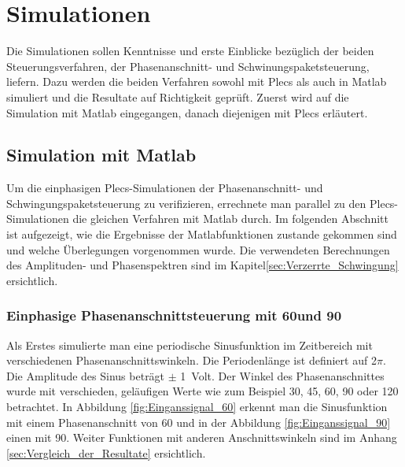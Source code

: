 \section{Simulationen}

Die Simulationen sollen Kenntnisse und erste Einblicke bezüglich der beiden Steuerungsverfahren, der Phasenanschnitt- und Schwinungspaketsteuerung, liefern. Dazu werden die beiden Verfahren sowohl mit Plecs als auch in Matlab simuliert und die Resultate auf Richtigkeit geprüft. Zuerst wird auf die Simulation mit Matlab eingegangen, danach diejenigen mit Plecs erläutert.

\subsection{Simulation mit Matlab}\label{sec:Simulation_mit_Matlab}
Um die einphasigen Plecs-Simulationen der Phasenanschnitt- und Schwingungspaketsteuerung zu verifizieren, errechnete man parallel zu den Plecs-Simulationen die gleichen Verfahren mit Matlab durch. Im folgenden Abschnitt ist aufgezeigt, wie die Ergebnisse der Matlabfunktionen zustande gekommen sind und welche Überlegungen vorgenommen wurde. Die verwendeten Berechnungen des Amplituden- und Phasenspektren sind im Kapitel\ref{sec:Verzerrte_Schwingung} ersichtlich.

\subsubsection{Einphasige Phasenanschnittsteuerung mit 60\textdegree und 90\textdegree}
Als Erstes simulierte man eine periodische Sinusfunktion im Zeitbereich mit verschiedenen Phasenanschnittswinkeln. Die Periodenlänge ist definiert auf 2$\pi$. Die Amplitude des Sinus beträgt $\pm$ \SI{1}{Volt}. Der Winkel des Phasenanschnittes wurde mit verschieden, geläufigen Werte wie zum Beispiel 30\textdegree, 45\textdegree \hspace{0.02cm}, 60\textdegree \hspace{0.02cm}, 90\textdegree \hspace{0.02cm} oder 120\textdegree \hspace{0.02cm} betrachtet. In Abbildung \ref{fig:Einganssignal_60} erkennt man die Sinusfunktion mit einem Phasenanschnitt von 60\textdegree \hspace{0.02cm} und in der Abbildung \ref{fig:Einganssignal_90} einen mit 
90\textdegree \hspace{0.02cm}. Weiter Funktionen mit anderen Anschnittswinkeln sind im Anhang \ref{sec:Vergleich_der_Resultate} ersichtlich.


